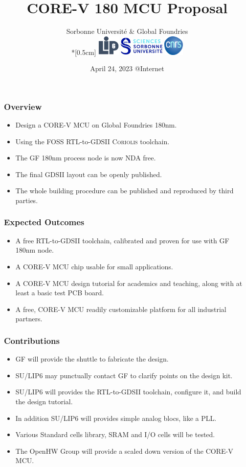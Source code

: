 \documentclass[10pt,aspectratio=169,presentation]{beamer}
\title{CORE-V 180 MCU Proposal}
\author[J.-P. \Chaput]{Sorbonne Université \& Global Foundries \\*[0.5cm]
                          \includegraphics[height=1.0cm]{./images/Logo-LIP6-bleugris}\hspace{0.5cm}
                          \includegraphics[height=0.9cm]{./images/Logo-SU}           \hspace{0.5cm}
                          \includegraphics[height=1.0cm]{./images/Logo-CNRS}%
                         }
\institute[SU-LIP6]{ \texttt{Jean-Paul.Chaput@lip6.fr} }
\date[April 24, 2023]{April 24, 2023 @Internet}
\newcommand {\NDA}           {\textsc{NDA}\xspace}
\newcommand {\Coriolis}      {\textsc{Coriolis}\xspace}
\newcommand {\GDSII}         {\textsc{GDSII}\xspace}
\begin{document}
   \titlepage


   \begin{frame}
     \frametitle{Overview}
     \begin{itemize}
       \setlength\itemsep{1.0\baselineskip}
       \item Design a CORE-V MCU on Global Foundries 180nm.
       \item Using the FOSS RTL-to-GDSII \Coriolis toolchain.
       \item The GF 180nm process node is now \NDA free.
       \item The final \GDSII layout can be openly published.
       \item The whole building procedure can be published and
             reproduced by third parties.
     \end{itemize}
   \end{frame}


   \begin{frame}
     \frametitle{Expected Outcomes}
     \begin{itemize}
       \setlength\itemsep{1.0\baselineskip}
       \item A free  RTL-to-GDSII toolchain, calibrated and proven for use
             with GF 180nm node.
       \item A CORE-V MCU chip usable for small applications. 
       \item A CORE-V MCU design tutorial for academics and teaching,
             along with at least a basic test PCB board.
       \item A free, CORE-V MCU readily customizable platform for all
             industrial partners.
     \end{itemize}
   \end{frame}


   \begin{frame}
     \frametitle{Contributions}
     \begin{itemize}
       \setlength\itemsep{1.0\baselineskip}
       \item GF will provide the shuttle to fabricate the design.
       \item SU/LIP6 may punctually contact GF to clarify points on the design kit.
       \item SU/LIP6 will provides the RTL-to-GDSII toolchain, configure it,
             and build the design tutorial.
       \item In addition SU/LIP6 will provides simple analog blocs, like a PLL.
       \item Various Standard cells library, SRAM and I/O cells will be tested.
       \item The OpenHW Group will provide a scaled down version of the
             CORE-V MCU.
     \end{itemize}
   \end{frame}
\end{document}
